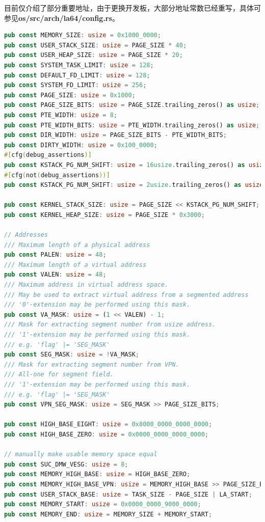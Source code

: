 目前仅介绍了部分重要地址，由于更换开发板，大部分地址常数已经重写，具体可参见\textbf{os/src/arch/la64/config.rs}。
\begin{lstlisting}[language={rust}, label={code:config},
    caption={os/src/arch/la64/config.rs}]
pub const MEMORY_SIZE: usize = 0x1000_0000;
pub const USER_STACK_SIZE: usize = PAGE_SIZE * 40;
pub const USER_HEAP_SIZE: usize = PAGE_SIZE * 20;
pub const SYSTEM_TASK_LIMIT: usize = 128;
pub const DEFAULT_FD_LIMIT: usize = 128;
pub const SYSTEM_FD_LIMIT: usize = 256;
pub const PAGE_SIZE: usize = 0x1000;
pub const PAGE_SIZE_BITS: usize = PAGE_SIZE.trailing_zeros() as usize;
pub const PTE_WIDTH: usize = 8;
pub const PTE_WIDTH_BITS: usize = PTE_WIDTH.trailing_zeros() as usize;
pub const DIR_WIDTH: usize = PAGE_SIZE_BITS - PTE_WIDTH_BITS;
pub const DIRTY_WIDTH: usize = 0x100_0000;
#[cfg(debug_assertions)]
pub const KSTACK_PG_NUM_SHIFT: usize = 16usize.trailing_zeros() as usize;
#[cfg(not(debug_assertions))]
pub const KSTACK_PG_NUM_SHIFT: usize = 2usize.trailing_zeros() as usize;

pub const KERNEL_STACK_SIZE: usize = PAGE_SIZE << KSTACK_PG_NUM_SHIFT;
pub const KERNEL_HEAP_SIZE: usize = PAGE_SIZE * 0x3000;

// Addresses
/// Maximum length of a physical address
pub const PALEN: usize = 48;
/// Maximum length of a virtual address
pub const VALEN: usize = 48;
/// Maximum address in virtual address space.
/// May be used to extract virtual address from a segmented address
/// '0'-extension may be performed using this mask.
pub const VA_MASK: usize = (1 << VALEN) - 1;
/// Mask for extracting segment number from usize address.
/// '1'-extension may be performed using this mask.
/// e.g. 'flag' |= 'SEG_MASK'
pub const SEG_MASK: usize = !VA_MASK;
/// Mask for extracting segment number from VPN.
/// All-one for segment field.
/// '1'-extension may be performed using this mask.
/// e.g. 'flag' |= 'SEG_MASK'
pub const VPN_SEG_MASK: usize = SEG_MASK >> PAGE_SIZE_BITS;

pub const HIGH_BASE_EIGHT: usize = 0x8000_0000_0000_0000;
pub const HIGH_BASE_ZERO: usize = 0x0000_0000_0000_0000;

// manually make usable memory space equal
pub const SUC_DMW_VESG: usize = 8;
pub const MEMORY_HIGH_BASE: usize = HIGH_BASE_ZERO;
pub const MEMORY_HIGH_BASE_VPN: usize = MEMORY_HIGH_BASE >> PAGE_SIZE_BITS;
pub const USER_STACK_BASE: usize = TASK_SIZE - PAGE_SIZE | LA_START;
pub const MEMORY_START: usize = 0x0000_0000_9000_0000;
pub const MEMORY_END: usize = MEMORY_SIZE + MEMORY_START;


\end{lstlisting}

